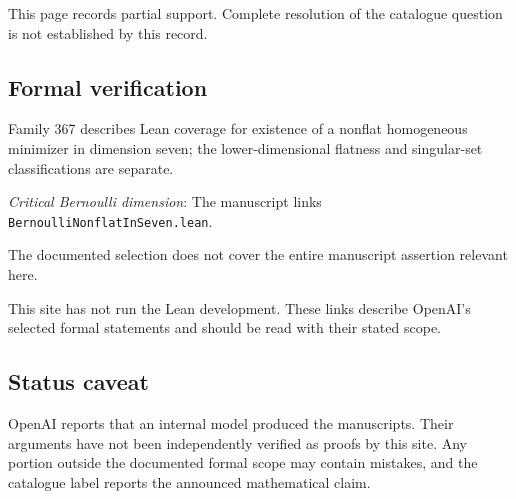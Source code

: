 \documentclass[11pt]{article}
\begin{document}
This page records partial support. Complete resolution of the catalogue question is not established by this record.

\subsection{Formal verification}
Family 367 describes Lean coverage for existence of a nonflat homogeneous minimizer in dimension seven; the lower-dimensional flatness and singular-set classifications are separate.

\textit{Critical Bernoulli dimension}: The manuscript links \texttt{BernoulliNonflatInSeven.lean}.

The documented selection does not cover the entire manuscript assertion relevant here.

This site has not run the Lean development. These links describe OpenAI’s selected formal statements and should be read with their stated scope.

\subsection{Status caveat}
OpenAI reports that an internal model produced the manuscripts. Their arguments have not been independently verified as proofs by this site. Any portion outside the documented formal scope may contain mistakes, and the catalogue label reports the announced mathematical claim.
\end{document}
